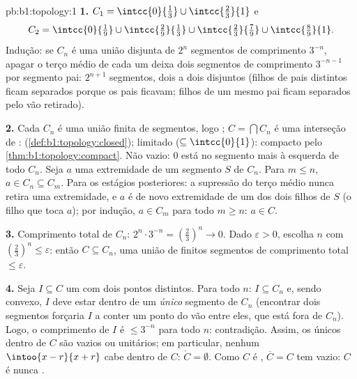 \begin{solution}{pb:b1:topology:1}
\textbf{1.} $C_1 = \intcc{0}{\frac13} \cup \intcc{\frac23}{1}$
e
\[
C_2 = \intcc{0}{\tfrac19} \cup \intcc{\tfrac29}{\tfrac13}
\cup \intcc{\tfrac23}{\tfrac79} \cup \intcc{\tfrac89}{1} .
\]
Indução: se $C_n$ é uma união disjunta de $2^n$ segmentos 
de comprimento $3^{-n}$, apagar o terço médio  de cada um
deixa dois segmentos  de comprimento $3^{-n-1}$ por segmento
pai: $2^{n+1}$ segmentos, dois a dois disjuntos (filhos de pais
distintos ficam separados porque os pais ficavam; filhos de um mesmo
pai ficam separados pelo vão retirado).

\textbf{2.} Cada $C_n$ é uma união finita de segmentos, logo
; $C = \bigcap C_n$ é uma interseção de :
 (\cref{def:b1:topology:closed}); limitado ($\subseteq
\intcc{0}{1}$): compacto pelo \cref{thm:b1:topology:compact}.
Não vazio: $0$ está no segmento mais à esquerda de todo $C_n$. Seja
$a$ uma extremidade de um segmento $S$ de $C_n$. Para $m \leq n$,
$a \in C_n \subseteq C_m$. Para os estágios posteriores: a supressão do terço
médio nunca retira uma extremidade, e $a$ é de novo extremidade
de um dos dois filhos de $S$ (o filho que toca $a$); por
indução, $a \in C_m$ para todo $m \geq n$: $a \in C$.

\textbf{3.} Comprimento total de $C_n$: $2^n \cdot 3^{-n} =
(\frac23)^n \to 0$. Dado $\varepsilon > 0$, escolha $n$ com
$(\frac23)^n \leq \varepsilon$: então $C \subseteq C_n$, uma união
de finitos segmentos de comprimento total $\leq \varepsilon$.

\textbf{4.} Seja $I \subseteq C$ um  com dois pontos
distintos. Para todo $n$: $I \subseteq C_n$ e, sendo convexo, $I$
deve estar dentro de um \emph{único} segmento de $C_n$ (encontrar dois
segmentos forçaria $I$ a conter um ponto do vão entre
eles, que está fora de $C_n$). Logo, o comprimento de $I$ é $\leq
3^{-n}$ para todo $n$: contradição. Assim, os únicos 
dentro de $C$ são vazios ou unitários; em particular, nenhum
$\intoo{x-r}{x+r}$ cabe dentro de $C$: $\mathring C = \emptyset$.
Como $C$ é , $\overline C = C$ tem  vazio: $C$ é
nunca .


\end{solution}
